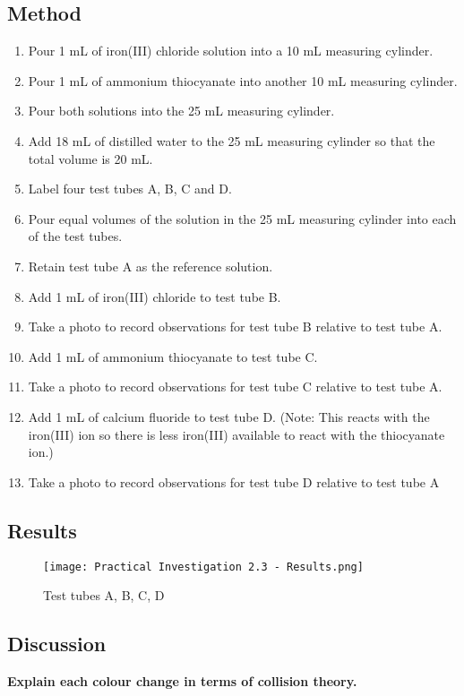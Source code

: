 	\subsection{Method}
		\begin{enumerate}
			\item Pour 1 mL of iron(III) chloride solution into a 10 mL measuring cylinder.
			\item Pour 1 mL of ammonium thiocyanate into another 10 mL measuring cylinder.
			\item Pour both solutions into the 25 mL measuring cylinder.
			\item Add 18 mL of distilled water to the 25 mL measuring cylinder so that the total volume is 20 mL.
			\item Label four test tubes A, B, C and D.
			\item Pour equal volumes of the solution in the 25 mL measuring cylinder into each of the test tubes.
			\item Retain test tube A as the reference solution.
			\item Add 1 mL of iron(III) chloride to test tube B.
			\item Take a photo to record observations for test tube B relative to test tube A.
			\item Add 1 mL of ammonium thiocyanate to test tube C.
			\item Take a photo to record observations for test tube C relative to test tube A.
			\item Add 1 mL of calcium fluoride to test tube D. (Note: This reacts with the iron(III) ion so there is less iron(III) available to react with the thiocyanate ion.)
			\item Take a photo to record observations for test tube D relative to test tube A
		\end{enumerate}

	\subsection{Results}
		\begin{figure}[H]
			\centering
			\texttt{[image: Practical Investigation 2.3 - Results.png]}
			\caption{Test tubes A, B, C, D}
		\end{figure}

	\subsection{Discussion}
		\textbf{Explain each colour change in terms of collision theory.}

